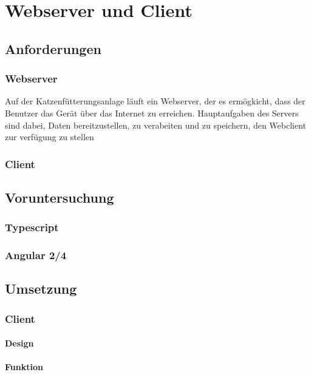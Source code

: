 \chapter{Webserver und Client}

\section{Anforderungen}

\subsection{Webserver}
Auf der Katzenfütterungsanlage läuft ein Webserver, der es ermögkicht, dass der Benutzer das Gerät über das Internet zu erreichen. Hauptaufgaben des Servers sind dabei, Daten bereitzustellen, zu verabeiten und zu speichern, den Webclient zur verfügung zu stellen

\subsection{Client}

\section{Voruntersuchung}

\subsection{Typescript}

\subsection{Angular 2/4}

\section{Umsetzung}

\subsection{Client}

\subsubsection{Design}

\subsubsection{Funktion}

